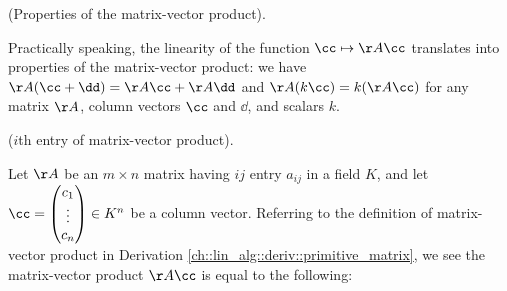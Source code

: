 \begin{theorem}
    (Properties of the matrix-vector product).
    
    Practically speaking, the linearity of the function $\cc \mapsto \AA \cc$ translates into properties of the matrix-vector product: we have $\AA(\cc + \dd) = \AA \cc + \AA \dd$ and $\AA(k\cc) = k(\AA \cc)$ for any matrix $\AA$, column vectors $\cc$ and $\dd$, and scalars $k$. 
\end{theorem}

\begin{theorem}
\label{ch::lin_alg::thm::coordinates_of_matrix_vector_product}
    ($i$th entry of matrix-vector product).
    
    Let $\AA$ be an $m \times n$ matrix having $ij$ entry $a_{ij}$ in a field $K$, and let $\cc = \begin{pmatrix} c_1 \\ \vdots \\ c_n \end{pmatrix} \in K^n$ be a column vector. Referring to the definition of matrix-vector product in Derivation \ref{ch::lin_alg::deriv::primitive_matrix}, we see the matrix-vector product $\AA \cc$ is equal to the following:
    

\end{theorem}
